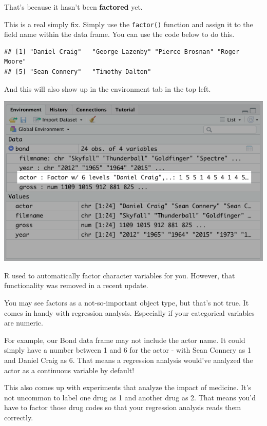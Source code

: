 \documentclass[
]{book}
\newenvironment{Shaded}{\begin{snugshade}}{\end{snugshade}}
\newcommand{\KeywordTok}[1]{\textcolor[rgb]{0.13,0.29,0.53}{\textbf{#1}}}
\newcommand{\NormalTok}[1]{#1}
\newcommand{\OperatorTok}[1]{\textcolor[rgb]{0.81,0.36,0.00}{\textbf{#1}}}
\newcommand{\StringTok}[1]{\textcolor[rgb]{0.31,0.60,0.02}{#1}}
\begin{document}
That's because it hasn't been \textbf{factored} yet.

This is a real simply fix. Simply use the \texttt{factor()} function and assign it to the field name within the data frame. You can use the code below to do this.

\begin{Shaded}
\end{Shaded}

\begin{verbatim}
## [1] "Daniel Craig"   "George Lazenby" "Pierce Brosnan" "Roger Moore"   
## [5] "Sean Connery"   "Timothy Dalton"
\end{verbatim}

And this will also show up in the environment tab in the top left.

\begin{center}\includegraphics[width=0.5\linewidth]{1.31_Factors_in_Enviornment} \end{center}

R used to automatically factor character variables for you. However, that functionality was removed in a recent update.

You may see factors as a not-so-important object type, but that's not true. It comes in handy with regression analysis. Especially if your categorical variables are numeric.

For example, our Bond data frame may not include the actor name. It could simply have a number between 1 and 6 for the actor - with Sean Connery as 1 and Daniel Craig as 6. That means a regression analysis would've analyzed the actor as a continuous variable by default!

This also comes up with experiments that analyze the impact of medicine. It's not uncommon to label one drug as 1 and another drug as 2. That means you'd have to factor those drug codes so that your regression analysis reads them correctly.
\end{document}
